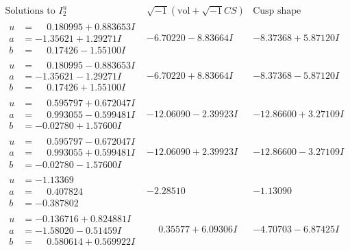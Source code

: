 \documentclass[1p]{elsarticle_modified}
\theoremstyle{definition}
\newcommand{\I}{\sqrt{-1}}
\begin{document}
$$\begin{array}{c|c|c}  
\text{Solutions to }I^u_{2}& \I (\text{vol} + \sqrt{-1}CS) & \text{Cusp shape}\\
 \hline 
\begin{aligned}
u &= \phantom{-}0.180995 + 0.883653 I \\
a &= -1.35621 + 1.29271 I \\
b &= \phantom{-}0.17426 - 1.55100 I\end{aligned}
 & -6.70220 - 8.83664 I & -8.37368 + 5.87120 I \\ \hline\begin{aligned}
u &= \phantom{-}0.180995 - 0.883653 I \\
a &= -1.35621 - 1.29271 I \\
b &= \phantom{-}0.17426 + 1.55100 I\end{aligned}
 & -6.70220 + 8.83664 I & -8.37368 - 5.87120 I \\ \hline\begin{aligned}
u &= \phantom{-}0.595797 + 0.672047 I \\
a &= \phantom{-}0.993055 - 0.599481 I \\
b &= -0.02780 + 1.57600 I\end{aligned}
 & -12.06090 - 2.39923 I & -12.86600 + 3.27109 I \\ \hline\begin{aligned}
u &= \phantom{-}0.595797 - 0.672047 I \\
a &= \phantom{-}0.993055 + 0.599481 I \\
b &= -0.02780 - 1.57600 I\end{aligned}
 & -12.06090 + 2.39923 I & -12.86600 - 3.27109 I \\ \hline\begin{aligned}
u &= -1.13369\phantom{ +0.000000I} \\
a &= \phantom{-}0.407824\phantom{ +0.000000I} \\
b &= -0.387802\phantom{ +0.000000I}\end{aligned}
 & -2.28510\phantom{ +0.000000I} & -1.13090\phantom{ +0.000000I} \\ \hline\begin{aligned}
u &= -0.136716 + 0.824881 I \\
a &= -1.58020 - 0.51459 I \\
b &= \phantom{-}0.580614 + 0.569922 I\end{aligned}
 & \phantom{-}0.35577 + 6.09306 I & -4.70703 - 6.87425 I \\ \hline\begin{aligned}

\end{aligned}
\end{array}$$
\end{document}
